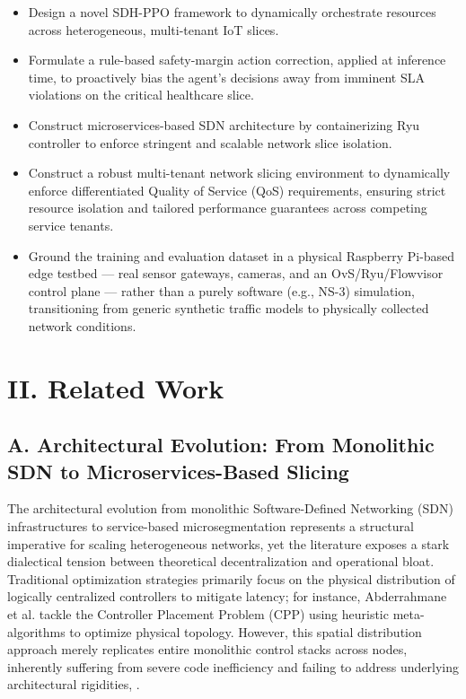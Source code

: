\documentclass[conference]{IEEEtran}
\begin{document}
\begin{itemize}
\item
  Design a novel SDH-PPO framework to dynamically orchestrate resources across heterogeneous, multi-tenant IoT slices.
\item
  Formulate a rule-based safety-margin action correction, applied at inference time, to proactively bias the agent's decisions away from imminent SLA violations on the critical healthcare slice.
\item
  Construct microservices-based SDN architecture by containerizing Ryu controller to enforce stringent and scalable network slice isolation.
\item
  Construct a robust multi-tenant network slicing environment to dynamically enforce differentiated Quality of Service (QoS) requirements, ensuring strict resource isolation and tailored performance guarantees across competing service tenants.
\item
  Ground the training and evaluation dataset in a physical Raspberry Pi-based edge testbed --- real sensor gateways, cameras, and an OvS/Ryu/Flowvisor control plane --- rather than a purely software (e.g., NS-3) simulation, transitioning from generic synthetic traffic models to physically collected network conditions.
\end{itemize}

\section{II. Related Work}\label{ii.-related-work}

\subsection{A. Architectural Evolution: From Monolithic SDN to Microservices-Based Slicing}\label{a.-architectural-evolution-from-monolithic-sdn-to-microservices-based-slicing}

The architectural evolution from monolithic Software-Defined Networking (SDN) infrastructures to service-based microsegmentation represents a structural imperative for scaling heterogeneous networks, yet the literature exposes a stark dialectical tension between theoretical decentralization and operational bloat. Traditional optimization strategies primarily focus on the physical distribution of logically centralized controllers to mitigate latency; for instance, Abderrahmane et al. tackle the Controller Placement Problem (CPP) using heuristic meta-algorithms to optimize physical topology\cite{b19}. However, this spatial distribution approach merely replicates entire monolithic control stacks across nodes, inherently suffering from severe code inefficiency and failing to address underlying architectural rigidities\cite{b8}, \cite{b19}.
\end{document}

